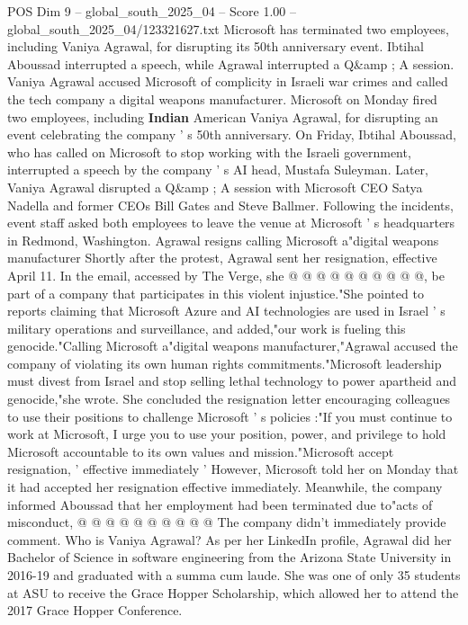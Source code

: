 \begin{textsample}{POS Dim 9 – global\_south\_2025\_04 – Score 1.00 – global\_south\_2025\_04/123321627.txt}  \label{ex:f9_pos_147}
Microsoft has terminated two employees, including Vaniya Agrawal, for disrupting its 50th anniversary event.
Ibtihal Aboussad interrupted a speech, while Agrawal interrupted a Q\&amp ; A session.
Vaniya Agrawal accused Microsoft of complicity in Israeli war crimes and called the tech company a digital weapons manufacturer.
Microsoft on Monday fired two employees, including \textbf{Indian} American Vaniya Agrawal, for disrupting an event celebrating the company ' s 50th anniversary.
On Friday, Ibtihal Aboussad, who has called on Microsoft to stop working with the Israeli government, interrupted a speech by the company ' s AI head, Mustafa Suleyman.
Later, Vaniya Agrawal disrupted a Q\&amp ; A session with Microsoft CEO Satya Nadella and former CEOs Bill Gates and Steve Ballmer.
Following the incidents, event staff asked both employees to leave the venue at Microsoft ' s headquarters in Redmond, Washington.
Agrawal resigns calling Microsoft a"digital weapons manufacturer Shortly after the protest, Agrawal sent her resignation, effective April 11.
In the email, accessed by The Verge, she @ @ @ @ @ @ @ @ @ @, be part of a company that participates in this violent injustice."She pointed to reports claiming that Microsoft Azure and AI technologies are used in Israel ' s military operations and surveillance, and added,"our work is fueling this genocide."Calling Microsoft a"digital weapons manufacturer,"Agrawal accused the company of violating its own human rights commitments."Microsoft leadership must divest from Israel and stop selling lethal technology to power apartheid and genocide,"she wrote.
She concluded the resignation letter encouraging colleagues to use their positions to challenge Microsoft ' s policies :"If you must continue to work at Microsoft, I urge you to use your position, power, and privilege to hold Microsoft accountable to its own values and mission."Microsoft accept resignation, ' effective immediately ' However, Microsoft told her on Monday that it had accepted her resignation effective immediately.
Meanwhile, the company informed Aboussad that her employment had been terminated due to"acts of misconduct, @ @ @ @ @ @ @ @ @ @ The company didn't immediately provide comment.
Who is Vaniya Agrawal?
As per her LinkedIn profile, Agrawal did her Bachelor of Science in software engineering from the Arizona State University in 2016-19 and graduated with a summa cum laude.
She was one of only 35 students at ASU to receive the Grace Hopper Scholarship, which allowed her to attend the 2017 Grace Hopper Conference.

\end{textsample}
